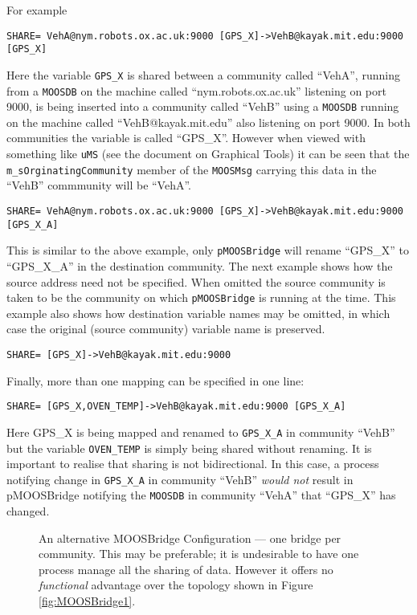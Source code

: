 \documentclass[a4paper,10pt]{article}
\newcommand{\Code}[1]{\texttt{#1} }
\newcommand{\code}[1]{\Code{#1} }
\newcommand{\DB}   {\code{{MOOSDB}}}
\begin{document}
For example\\
\begin{verbatim}
SHARE= VehA@nym.robots.ox.ac.uk:9000 [GPS_X]->VehB@kayak.mit.edu:9000 [GPS_X]
\end{verbatim}
Here the variable \code{GPS\_X} is shared between a community called ``VehA'', running from a \DB on the machine called
``nym.robots.ox.ac.uk'' listening on port 9000, is being inserted into a community called ``VehB'' using a \DB running on the machine called
``VehB@kayak.mit.edu'' also listening on port 9000. In both communities the variable is called ``GPS\_X''. However when viewed with
something like \code{uMS} (see the document on Graphical Tools) it can be seen that the \code{m\_sOrginatingCommunity} member of the \code{MOOSMsg}
carrying this data in the ``VehB'' commmunity will be ``VehA''.

\begin{verbatim}
SHARE= VehA@nym.robots.ox.ac.uk:9000 [GPS_X]->VehB@kayak.mit.edu:9000 [GPS_X_A]
\end{verbatim}
This is similar to the above example, only \code{pMOOSBridge} will rename ``GPS\_X'' to ``GPS\_X\_A'' in the
destination community. The next example shows how the source address need not be specified. When omitted the source community is
taken to be the community on which \code{pMOOSBridge} is running at the time. This example also shows how destination variable names may be omitted, in
which case the original (source community) variable name is preserved.
\begin{verbatim}
SHARE= [GPS_X]->VehB@kayak.mit.edu:9000
\end{verbatim}
Finally, more than one mapping can be specified in one line:
\begin{verbatim}
SHARE= [GPS_X,OVEN_TEMP]->VehB@kayak.mit.edu:9000 [GPS_X_A]
\end{verbatim}
Here GPS\_X is being mapped and renamed to \code{GPS\_X\_A} in community ``VehB'' but the variable \code{OVEN\_TEMP} is simply being shared without renaming.
It is important to realise that sharing is not bidirectional. In this case, a process notifying change in \code{GPS\_X\_A} in community ``VehB'' \emph{would not}
result in pMOOSBridge notifying the \DB in community ``VehA'' that ``GPS\_X'' has changed.


\begin{figure}[ht]
\centering {} \caption{An alternative MOOSBridge Configuration
--- one bridge per community. This may be preferable; it is undesirable to have one process manage all
the sharing of data. However it offers no \emph{functional} advantage over the topology shown in Figure
\ref{fig:MOOSBridge1}.}\label{fig:MOOSBridge2}
\end{figure}
\end{document}
